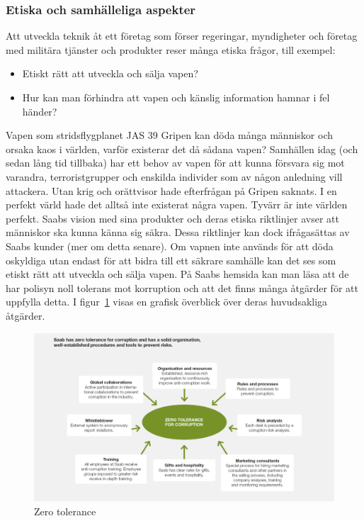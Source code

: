 \subsubsection{Etiska och samhälleliga aspekter}
Att utveckla teknik åt ett företag som förser regeringar, myndigheter och företag med militära tjänster och produkter reser många etiska frågor, till exempel: 
\begin{itemize}
\item Etiskt rätt att utveckla och sälja vapen?
\item Hur kan man förhindra att vapen och känslig information hamnar i fel händer? 
\end{itemize} 
Vapen som stridsflygplanet JAS 39 Gripen kan döda många människor och orsaka kaos i världen, varför existerar det då sådana vapen? Samhällen idag (och sedan lång tid tillbaka) har ett behov av vapen för att kunna försvara sig mot varandra, terroristgrupper och enskilda individer som av någon anledning vill attackera. Utan krig och orättvisor hade efterfrågan på Gripen saknats. I en perfekt värld hade det alltså inte existerat några vapen. Tyvärr är inte världen perfekt. 
\newline
\newline
Saabs vision med sina produkter och deras etiska riktlinjer avser att människor ska kunna känna sig säkra. Dessa riktlinjer kan dock ifrågasättas av Saabs kunder (mer om detta senare). Om vapnen inte används för att döda oskyldiga utan endast för att bidra till ett säkrare samhälle kan det ses som etiskt rätt att utveckla och sälja vapen. 
\newline
\newline   
På Saabs hemsida kan man läsa att de har polisyn noll tolerans mot korruption och att det finns många åtgärder för att uppfylla detta. I figur~\ref{fig:zerotolerance} visas en grafisk överblick över deras huvudsakliga åtgärder. 
\leavevmode
\begin{figure}[h]
	\centering
	\includegraphics[scale=1.4]{grafik/modell_zero_corruption_1140x640.png}
	\caption{Zero tolerance}\label{fig:zerotolerance}
\end{figure}  
